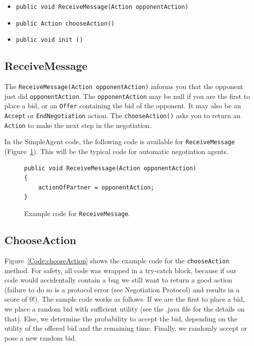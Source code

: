 \documentclass[]{article}
\begin{document}
\begin{itemize}
	\item \texttt{public void ReceiveMessage(Action opponentAction)}
	\item \texttt{public Action chooseAction()}
	\item \texttt{public void init ()}
\end{itemize}

\subsection{ReceiveMessage}
The \texttt{ReceiveMessage(Action opponentAction)} informs you that the opponent just did \texttt{opponentAction}. The \texttt{opponentAction} may be null if you are the first to place a bid, or an \texttt{Offer} containing the bid of the opponent. It may also be an \texttt{Accept} or \texttt{EndNegotiation} action.
The \texttt{chooseAction()} asks you to return an \texttt{Action} to make the next step in the negotiation.

In the SimpleAgent code, the following code is available for \texttt{ReceiveMessage} (Figure~\ref{Code:ReceiveMessage}). This will be the typical code for automatic negotiation agents.

\begin{figure}[htb]
\begin{lstlisting}
public void ReceiveMessage(Action opponentAction) 
{
	actionOfPartner = opponentAction;
}
\end{lstlisting}
\caption{Example code for \texttt{ReceiveMessage}.}\label{Code:ReceiveMessage}
\end{figure}

\subsection{ChooseAction}
Figure~\ref{Code:chooseAction} shows the example code for the \texttt{chooseAction} method. For safety, all code was wrapped in a try-catch block, because if our code would accidentally contain a bug we still want to return a good action (failure to do so is a protocol error (see Negotiation Protocol) and results in a score of 0!).
The sample code works as follows. If we are the first to place a bid, we place a random bid with sufficient utility (see the .java file for the details on that). Else, we determine the probability to accept the bid, depending on the utility of the offered bid and the remaining time. Finally, we randomly accept or pose a new random bid.
\end{document}
